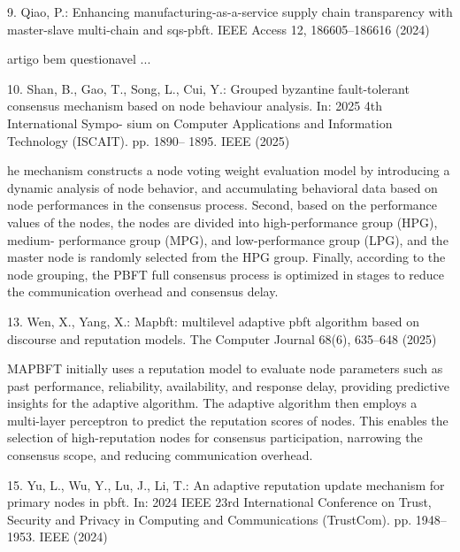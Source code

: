 9. Qiao, P.: Enhancing manufacturing-as-a-service supply chain transparency with
master-slave multi-chain and sqs-pbft. IEEE Access 12, 186605–186616 (2024)

artigo bem questionavel ...










10. Shan, B., Gao, T., Song, L., Cui, Y.: Grouped byzantine fault-tolerant consensus
mechanism based on node behaviour analysis. In: 2025 4th International Sympo-
sium on Computer Applications and Information Technology (ISCAIT). pp. 1890–
1895. IEEE (2025)

he mechanism constructs a
node voting weight evaluation model by introducing a dynamic
analysis of node behavior, and accumulating behavioral data
based on node performances in the consensus process. Second,
based on the performance values of the nodes, the nodes are
divided into high-performance group (HPG), medium-
performance group (MPG), and low-performance group (LPG),
and the master node is randomly selected from the HPG group.
Finally, according to the node grouping, the PBFT full consensus
process is optimized in stages to reduce the communication
overhead and consensus delay.






 
13. Wen, X., Yang, X.: Mapbft: multilevel adaptive pbft algorithm based on discourse
and reputation models. The Computer Journal 68(6), 635–648 (2025)

MAPBFT initially uses
a reputation model to evaluate node parameters such as past performance, reliability, availability, and response delay, providing
predictive insights for the adaptive algorithm. The adaptive algorithm then employs a multi-layer perceptron to predict the reputation
scores of nodes. This enables the selection of high-reputation nodes for consensus participation, narrowing the consensus scope,
and reducing communication overhead. 









15. Yu, L., Wu, Y., Lu, J., Li, T.: An adaptive reputation update mechanism for
primary nodes in pbft. In: 2024 IEEE 23rd International Conference on Trust,
Security and Privacy in Computing and Communications (TrustCom). pp. 1948–
1953. IEEE (2024)

